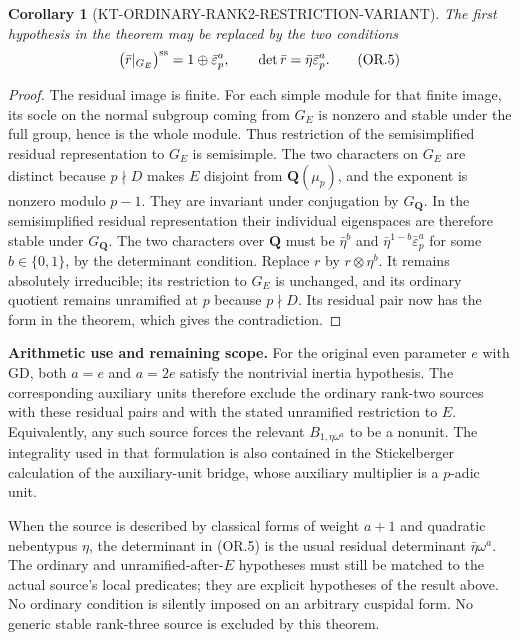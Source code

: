 \documentclass[11pt,a4paper]{article}
\newtheorem{corollary}[theorem]{Corollary}
\theoremstyle{definition}
\renewcommand{\paragraph}[1]{\par\smallskip\noindent\textbf{#1}\quad\ignorespaces}
\begin{document}
\begin{corollary}[KT-ORDINARY-RANK2-RESTRICTION-VARIANT]
The first hypothesis in the theorem may be replaced
by the two conditions
\[
 \bigl(\bar r|_{G_E}\bigr)^{\rm ss}
                  =1\oplus\bar\varepsilon_p^a,
 \qquad \det\bar r=\bar\eta\bar\varepsilon_p^a.          \tag{OR.5}
\]
\end{corollary}
\begin{proof}
The residual image is finite.  For each simple
module for that finite image, its socle on the
normal subgroup coming from $G_E$ is nonzero and
stable under the full group, hence is the whole
module.  Thus restriction of the semisimplified
residual representation to $G_E$ is semisimple.
The two characters on $G_E$ are distinct because
$p\nmid D$ makes $E$ disjoint from
$\mathbf Q(\mu_p)$, and the exponent is nonzero
modulo $p-1$.  They are invariant under conjugation
by $G_{\mathbf Q}$.  In the semisimplified residual
representation their individual eigenspaces are
therefore stable under $G_{\mathbf Q}$.  The two
characters over $\mathbf Q$ must be
$\bar\eta^b$ and
$\bar\eta^{1-b}\bar\varepsilon_p^a$ for some
$b\in\{0,1\}$, by the determinant condition.
Replace $r$ by $r\otimes\eta^b$.
It remains absolutely irreducible; its restriction
to $G_E$ is unchanged, and its ordinary quotient
remains unramified at $p$ because $p\nmid D$.
Its residual pair now has the form in the theorem,
which gives the contradiction.
\end{proof}

\paragraph{Arithmetic use and remaining scope.}
For the original even parameter $e$ with GD,
both $a=e$ and $a=2e$ satisfy the nontrivial
inertia hypothesis.  The corresponding auxiliary
units therefore exclude the ordinary rank-two
sources with these residual pairs and with the
stated unramified restriction to $E$.
Equivalently, any such source forces the relevant
$B_{1,\eta\omega^a}$ to be a nonunit.
The integrality used in that formulation is also
contained in the Stickelberger calculation of
the auxiliary-unit bridge, whose auxiliary
multiplier is a $p$-adic unit.

When the source is described by classical forms
of weight $a+1$ and quadratic nebentypus $\eta$,
the determinant in (OR.5) is the usual residual
determinant $\bar\eta\omega^a$.  The ordinary and
unramified-after-$E$ hypotheses must still be
matched to the actual source's local predicates;
they are explicit hypotheses of the result above.
No ordinary condition is silently imposed on
an arbitrary cuspidal form.  No generic stable
rank-three source is excluded by this theorem.
\end{document}
